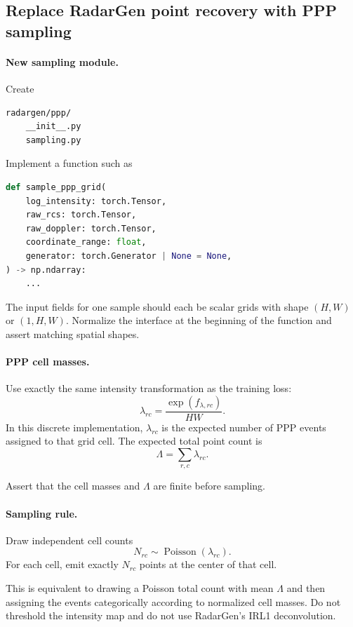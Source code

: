 \documentclass[11pt,a4paper]{article}
\begin{document}
\subsection{Replace RadarGen point recovery with PPP sampling}

\paragraph{New sampling module.}
Create
\begin{lstlisting}
radargen/ppp/
    __init__.py
    sampling.py
\end{lstlisting}

Implement a function such as
\begin{lstlisting}[language=Python]
def sample_ppp_grid(
    log_intensity: torch.Tensor,
    raw_rcs: torch.Tensor,
    raw_doppler: torch.Tensor,
    coordinate_range: float,
    generator: torch.Generator | None = None,
) -> np.ndarray:
    ...
\end{lstlisting}

The input fields for one sample should each be scalar grids with shape \((H,W)\) or \((1,H,W)\). Normalize the interface at the beginning of the function and assert matching spatial shapes.

\paragraph{PPP cell masses.}
Use exactly the same intensity transformation as the training loss:
\[
    \lambda_{rc}
    =
    \frac{\exp(f_{\lambda,rc})}{HW}.
\]
In this discrete implementation, \(\lambda_{rc}\) is the expected number of PPP events assigned to that grid cell. The expected total point count is
\[
    \Lambda
    =
    \sum_{r,c}\lambda_{rc}.
\]

Assert that the cell masses and \(\Lambda\) are finite before sampling.

\paragraph{Sampling rule.}
Draw independent cell counts
\[
    N_{rc}
    \sim
    \operatorname{Poisson}(\lambda_{rc}).
\]
For each cell, emit exactly \(N_{rc}\) points at the center of that cell.

This is equivalent to drawing a Poisson total count with mean \(\Lambda\) and then assigning the events categorically according to normalized cell masses. Do not threshold the intensity map and do not use RadarGen's IRL1 deconvolution.
\end{document}
